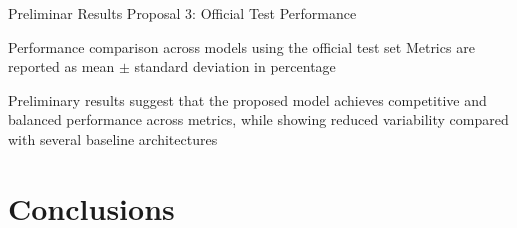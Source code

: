 \documentclass[aspectratio=169]{beamer}
\begin{document}
\begin{frame}{ Preliminar Results Proposal 3: Official Test Performance}

\centering Performance comparison across models using the official test set Metrics are \\ reported as mean $\pm$ standard deviation in percentage

\begin{table}
\centering
\label{tab:model_comparison_results}
\end{table}

\vspace{-0.15cm}
\begin{center}
{\color{frameblue}
Preliminary results suggest that the proposed model achieves competitive and balanced performance across metrics, while showing reduced variability compared with several baseline architectures}
\end{center}

\end{frame}


\section{Conclusions}
\end{document}
